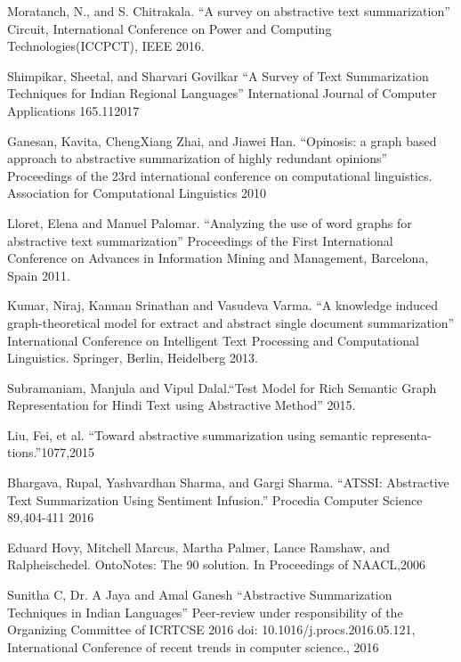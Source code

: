 \documentclass[11pt]{report}
\begin{document}
\begin{thebibliography}{999}
Moratanch, N., and S. Chitrakala. “A survey on abstractive text summarization” Circuit, International Conference on Power and Computing Technologies(ICCPCT), IEEE 2016.

Shimpikar, Sheetal, and Sharvari Govilkar “A Survey of Text Summarization Techniques for Indian Regional Languages” International Journal of Computer Applications 165.112017

Ganesan, Kavita, ChengXiang Zhai, and Jiawei Han. “Opinosis: a graph based approach to abstractive summarization of highly redundant opinions” Proceedings of the 23rd international conference on computational linguistics. Association for
Computational Linguistics 2010

Lloret, Elena and Manuel Palomar. “Analyzing the use of word graphs for abstractive text summarization” Proceedings of the First International Conference on Advances in Information Mining and Management, Barcelona, Spain 2011.

Kumar, Niraj, Kannan Srinathan and Vasudeva Varma. “A knowledge induced graph-theoretical model for extract and abstract single document summarization” International Conference on Intelligent Text Processing and Computational Linguistics. Springer, Berlin, Heidelberg 2013.

Subramaniam, Manjula and Vipul Dalal.“Test Model for Rich Semantic Graph Representation for Hindi Text using Abstractive Method” 2015.

Liu, Fei, et al. “Toward abstractive summarization using semantic representa-tions.”1077,2015

Bhargava, Rupal, Yashvardhan Sharma, and Gargi Sharma. “ATSSI: Abstractive Text Summarization Using Sentiment Infusion.” Procedia Computer Science 89,404-411 2016

Eduard Hovy, Mitchell Marcus, Martha Palmer, Lance Ramshaw, and Ralpheischedel. OntoNotes: The 90 solution. In Proceedings of NAACL,2006
 
Sunitha C, Dr. A Jaya and Amal Ganesh “Abstractive Summarization Techniques in Indian Languages” Peer-review under responsibility of the Organizing Committee of ICRTCSE 2016 doi: 10.1016/j.procs.2016.05.121, International Conference of recent trends in computer science., 2016

\end{thebibliography}
\end{document}
